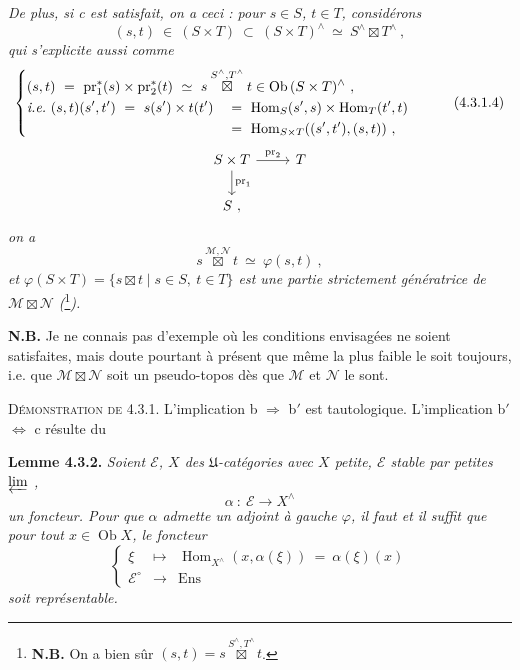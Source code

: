 \documentclass[11pt]{article}
\newcommand{\printedpage}[1]{\marginpar{\footnotesize p.~#1}}
\newcommand{\msp}[1]{\marginpar{\footnotesize [#1]}}
\newcommand{\Hom}{\operatorname{Hom}}
\newcommand{\Ob}{\operatorname{Ob}}
\newcommand{\pr}{\operatorname{pr}}
\begin{document}
\setcounter{footnote}{6}

\printedpage{9}

\noindent\textit{De plus, si c est satisfait, on a ceci : pour $s\in S$, $t\in T$, considérons}
\[
(s,t)\ \in\ (S\times T)\ \subset\ (S\times T)^\wedge\ \simeq\ S^\wedge\boxtimes T^\wedge\ ,
\]
\textit{qui s'explicite aussi comme}
\[
\left\{
\begin{aligned}
&\rlap{$\displaystyle (s,t)\ =\ \pr_1^*(s)\times\pr_2^*(t)\ \simeq\ s\overset{S^\wedge,T^\wedge}{\boxtimes}t\in\Ob\,(S\times T)^\wedge\ ,$}\\
&\textit{i.e.}\ (s,t)(s',t')\ =\ s(s')\times t(t') &&=\ \Hom_S(s',s)\times\Hom_T(t',t)\\
& &&=\ \Hom_{S\times T}((s',t'),(s,t))\ ,
\end{aligned}
\right.
\tag*{(4.3.1.4)}
\]
\[
\begin{tikzcd}
S\times T \arrow[r, "\mathrm{pr}_2"] \arrow[d, "\mathrm{pr}_1"] & T\\
S\ ,
\end{tikzcd}
\]
\msp{page 66}\textit{on a}
\[
s\overset{\mathcal M,\mathcal N}{\boxtimes}t\ \simeq\ \varphi(s,t)\ ,
\tag*{(4.3.1.4)}
\]
\textit{et $\varphi(S\times T)=\{s\boxtimes t\mid s\in S,\ t\in T\}$ est une partie strictement génératrice de $\mathcal M\boxtimes\mathcal N$ (}\footnote{\textbf{N.B.} On a bien sûr $(s,t)=s\overset{S^\wedge,T^\wedge}{\boxtimes}t$.}\textit{).}

\noindent\textbf{N.B.} Je ne connais pas d'exemple où les conditions envisagées ne soient satisfaites, mais doute pourtant à présent que même la plus faible le soit toujours, i.e. que $\mathcal M\boxtimes\mathcal N$ soit un pseudo-topos dès que $\mathcal M$ et $\mathcal N$ le sont.

\noindent\textsc{Démonstration de} 4.3.1. L'implication b $\Longrightarrow$ b$'$ est tautologique. L'implication b$'$ $\Longleftrightarrow$ c résulte du

\noindent\textbf{Lemme 4.3.2.} \textit{Soient $\mathcal E$, $X$ des $\mathfrak U$-catégories avec $X$ petite, $\mathcal E$ stable par petites $\varprojlim$ ,}
\[
\alpha\ :\ \mathcal E\longrightarrow X^\wedge
\]
\textit{un foncteur. Pour que $\alpha$ admette un adjoint à gauche $\varphi$, il faut et il suffit que pour tout $x\in\Ob X$, le foncteur}
\[
\left\{
\begin{array}{ccl}
\xi & \longmapsto & \Hom_{X^\wedge}(x,\alpha(\xi))\ =\ \alpha(\xi)(x)\\
\mathcal E^\circ & \longrightarrow & \mathrm{Ens}
\end{array}
\right.
\]
\textit{soit représentable.}
\end{document}
